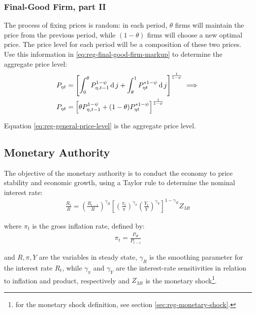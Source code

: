 \documentclass[
	thesis.tex
	]{subfiles}
\begin{document}
\subsubsection{Final-Good Firm, part II}

The process of fixing prices is random: in each period, $\theta$ firms will maintain the price from the previous period, while $(1-\theta)$ firms will choose a new optimal price. The price level for each period will be a composition of these two prices. Use this information in \ref{eq:reg-final-good-firm-markup} to determine the aggregate price level:
\begin{align}
	P_{\eta t} & = \left[ \int_{0}^{\theta} P_{\eta, t-1}^{1-\psi} \operatorname{d} j + \int_{\theta}^{1} P_{\eta t}^{\ast 1-\psi} \operatorname{d} j \right]^{\frac{1}{1-\psi}}  \implies \nonumber \\
	P_{\eta t} & = \left[ \theta P_{\eta, t-1}^{1-\psi} + (1-\theta) P_{\eta t}^{\ast 1-\psi} \right]^\frac{1}{1-\psi} \label{eq:reg-general-price-level}
\end{align}

Equation \ref{eq:reg-general-price-level} is the aggregate price level.


\subsection{Monetary Authority}

The objective of the monetary authority is to conduct the economy to price stability and economic growth, using a Taylor rule \cite{taylor_discretion_1993} to determine the nominal interest rate:
\begin{align}
	\label{eq:reg-monetary-policy}
	\frac{R_t}{R} =
	\left( \frac{R_{t-1}}{R} \right)^{\gamma_R}  \left[
	\left( \frac{\pi_t}{\pi} \right)^{\gamma_\pi}
	\left( \frac{Y_t}{Y} \right)^{\gamma_Y} \right]^{1-\gamma_R} Z_{Mt}
\end{align}

where $\pi_t$ is the gross inflation rate, defined by:
\begin{align}
	\pi_t = \frac{P_{\eta t}}{P_{t-1}}
	\label{eq:reg-gross-inflation-rate}
\end{align}

and $R, \pi, Y$ are the variables in steady state, $\gamma_R$ is the smoothing parameter for the interest rate $R_t$, while $\gamma_\pi$ and $\gamma_Y$ are the interest-rate sensitivities in relation to inflation and product, respectively and $Z_{Mt}$ is the monetary shock\footnote{for the monetary shock definition, see section \ref{sec:reg-monetary-shock}.}.
\end{document}

